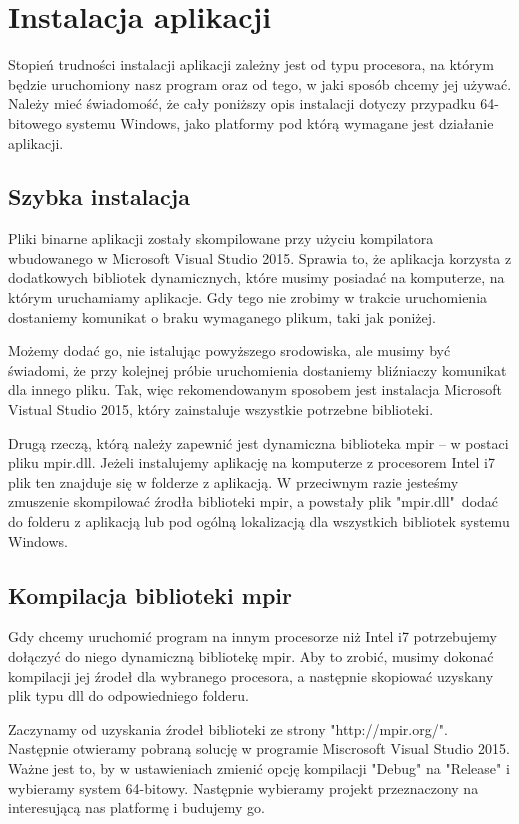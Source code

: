 \documentclass[oneside,a4paper]{book}
\begin{document}
	\section{Instalacja aplikacji}
	
	Stopień trudności instalacji aplikacji zależny jest od typu procesora, na którym będzie uruchomiony nasz program oraz od tego, w jaki sposób chcemy jej używać. Należy mieć świadomość, że cały poniższy opis instalacji dotyczy przypadku 64-bitowego systemu Windows, jako platformy pod którą wymagane jest działanie aplikacji.
	
	\subsection{Szybka instalacja}
	
	Pliki binarne aplikacji zostały skompilowane przy użyciu kompilatora wbudowanego w Microsoft Visual Studio 2015. Sprawia to, że aplikacja korzysta z dodatkowych bibliotek dynamicznych, które musimy posiadać na komputerze, na którym uruchamiamy aplikacje. Gdy tego nie zrobimy w trakcie uruchomienia dostaniemy komunikat o braku wymaganego plikum, taki jak poniżej.
	
	Możemy dodać go, nie istalując powyższego srodowiska, ale musimy być świadomi, że przy kolejnej próbie uruchomienia dostaniemy bliźniaczy komunikat dla innego pliku. Tak, więc rekomendowanym sposobem jest instalacja Microsoft Vistual Studio 2015, który zainstaluje wszystkie potrzebne biblioteki.
	
	Drugą rzeczą, którą należy zapewnić jest dynamiczna biblioteka mpir -- w postaci pliku mpir.dll. Jeżeli instalujemy aplikację na komputerze z procesorem Intel i7 plik ten znajduje się w folderze z aplikacją. W przeciwnym razie jesteśmy zmuszenie skompilować źrodła biblioteki mpir, a powstały plik "mpir.dll"\ dodać do folderu z aplikacją lub pod ogólną lokalizacją dla wszystkich bibliotek systemu Windows.
	
	\subsection{Kompilacja biblioteki mpir}
	
	Gdy chcemy uruchomić program na innym procesorze niż Intel i7 potrzebujemy dołączyć do niego dynamiczną bibliotekę mpir. Aby to zrobić, musimy dokonać kompilacji jej źrodeł dla wybranego procesora, a następnie skopiować uzyskany plik typu dll do odpowiedniego folderu.
	
	Zaczynamy od uzyskania źrodeł biblioteki ze strony "http://mpir.org/". Następnie otwieramy pobraną solucję w programie Miscrosoft Visual Studio 2015. Ważne jest to, by w ustawieniach zmienić opcję kompilacji "Debug" na "Release" i wybieramy system 64-bitowy. Następnie wybieramy projekt przeznaczony na interesującą nas platformę i budujemy go.
	
\end{document}
